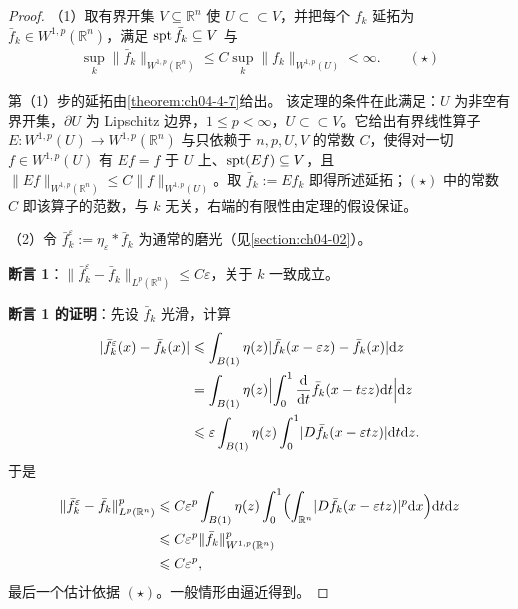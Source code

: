 ﻿\documentclass[../../main.tex]{subfiles}%
\begin{document}
\begin{proof}
（1）取有界开集 $V\subseteq\mathbb{R}^n$ 使 $U\subset\subset V$，并把每个 $f_k$ 延拓为 $\bar f_k\in W^{1,p}(\mathbb{R}^n)$，满足 $\operatorname{spt}\bar f_k\subseteq V$ 与
\begin{align*}
\sup_{k}\lVert\bar f_k\rVert_{W^{1,p}(\mathbb{R}^n)}\leqslant C\sup_{k}\lVert f_k\rVert_{W^{1,p}(U)}<\infty .\qquad(\star)
\end{align*}

第（1）步的延拓由\cref{theorem:ch04-4-7}给出。%
该定理的条件在此满足：$U$ 为非空有界开集，$\partial U$ 为 Lipschitz 边界，$1\leqslant p<\infty$，$U\subset\subset V$。它给出有界线性算子 $E:W^{1,p}(U)\to W^{1,p}(\mathbb{R}^n)$ 与只依赖于 $n,p,U,V$ 的常数 $C$，使得对一切 $f\in W^{1,p}(U)$ 有 $Ef=f$ 于 $U$ 上、$\operatorname{spt}(Ef)\subseteq V$，且 $\lVert Ef\rVert_{W^{1,p}(\mathbb{R}^n)}\leqslant C\lVert f\rVert_{W^{1,p}(U)}$。取 $\bar f_k:=Ef_k$ 即得所述延拓；$(\star)$ 中的常数 $C$ 即该算子的范数，与 $k$ 无关，右端的有限性由定理的假设保证。

（2）令 $\bar f_k^\varepsilon:=\eta_\varepsilon*\bar f_k$ 为通常的磨光（见\cref{section:ch04-02}）。%

\textbf{断言 1}：$\lVert\bar f_k^\varepsilon-\bar f_k\rVert_{L^p(\mathbb{R}^n)}\leqslant C\varepsilon$，关于 $k$ 一致成立。

\textbf{断言 1 的证明}：先设 $\bar f_k$ 光滑，计算
\begin{align*}
\lvert\bar f_k^\varepsilon(x)-\bar f_k(x)\rvert
&\leqslant\int_{B(1)}\eta(z)\lvert\bar f_k(x-\varepsilon z)-\bar f_k(x)\rvert\mathrm{d} z\\
&=\int_{B(1)}\eta(z)\Bigl\lvert\int_0^1\frac{\mathrm{d}}{\mathrm{d} t}\bar f_k(x-t\varepsilon z)\mathrm{d} t\Bigr\rvert\mathrm{d} z\\
&\leqslant\varepsilon\int_{B(1)}\eta(z)\int_0^1\lvert D\bar f_k(x-\varepsilon tz)\rvert\mathrm{d} t\mathrm{d} z .
\end{align*}
于是
\begin{align*}
\lVert\bar f_k^\varepsilon-\bar f_k\rVert^p_{L^p(\mathbb{R}^n)}
&\leqslant C\varepsilon^p\int_{B(1)}\eta(z)\int_0^1\Bigl(\int_{\mathbb{R}^n}\lvert D\bar f_k(x-\varepsilon tz)\rvert^p\mathrm{d} x\Bigr)\mathrm{d} t\mathrm{d} z\\
&\leqslant C\varepsilon^p\lVert\bar f_k\rVert^p_{W^{1,p}(\mathbb{R}^n)}\\
&\leqslant C\varepsilon^p ,
\end{align*}
最后一个估计依据 $(\star)$。一般情形由逼近得到。


\end{proof}
\end{document}
